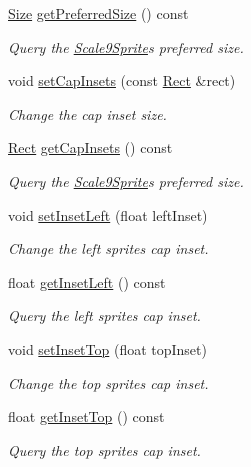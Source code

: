 \begin{DoxyCompactItemize}
\hyperlink{classSize}{Size} \hyperlink{classui_1_1Scale9Sprite_aeb8648160608228729e97d474d132088}{get\+Preferred\+Size} () const
\begin{DoxyCompactList}\small\item\em Query the \hyperlink{classui_1_1Scale9Sprite}{Scale9\+Sprite}\textquotesingle{}s preferred size. \end{DoxyCompactList}\item 
void \hyperlink{classui_1_1Scale9Sprite_a6ebd3b7211991bd3b33a9771f6e2b13a}{set\+Cap\+Insets} (const \hyperlink{classRect}{Rect} \&rect)
\begin{DoxyCompactList}\small\item\em Change the cap inset size. \end{DoxyCompactList}\item 
\hyperlink{classRect}{Rect} \hyperlink{classui_1_1Scale9Sprite_a699a2183a93e6783cece3fd4c3f20d41}{get\+Cap\+Insets} () const
\begin{DoxyCompactList}\small\item\em Query the \hyperlink{classui_1_1Scale9Sprite}{Scale9\+Sprite}\textquotesingle{}s preferred size. \end{DoxyCompactList}\item 
void \hyperlink{classui_1_1Scale9Sprite_a7c74dd002fd7fbd2a2afdfc2e69be278}{set\+Inset\+Left} (float left\+Inset)
\begin{DoxyCompactList}\small\item\em Change the left sprite\textquotesingle{}s cap inset. \end{DoxyCompactList}\item 
float \hyperlink{classui_1_1Scale9Sprite_ab59329e213341b7c0a733414519e66ed}{get\+Inset\+Left} () const
\begin{DoxyCompactList}\small\item\em Query the left sprite\textquotesingle{}s cap inset. \end{DoxyCompactList}\item 
void \hyperlink{classui_1_1Scale9Sprite_a451123a4d8cd3c734aecdce03ad59ae0}{set\+Inset\+Top} (float top\+Inset)
\begin{DoxyCompactList}\small\item\em Change the top sprite\textquotesingle{}s cap inset. \end{DoxyCompactList}\item 
float \hyperlink{classui_1_1Scale9Sprite_a27abc5e0690a25e0cad56255601bc108}{get\+Inset\+Top} () const
\begin{DoxyCompactList}\small\item\em Query the top sprite\textquotesingle{}s cap inset. \end{DoxyCompactList}\item 

\end{DoxyCompactItemize}
